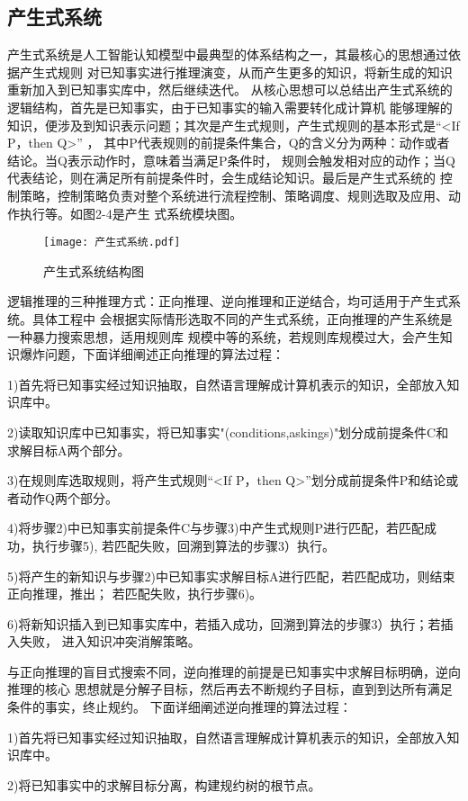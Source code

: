 \documentclass{standalone}
\begin{document}
\subsection{产生式系统}
产生式系统是人工智能认知模型中最典型的体系结构之一，其最核心的思想通过依据产生式规则
对已知事实进行推理演变，从而产生更多的知识，将新生成的知识重新加入到已知事实库中，然后继续迭代。
从核心思想可以总结出产生式系统的逻辑结构，首先是已知事实，由于已知事实的输入需要转化成计算机
能够理解的知识，便涉及到知识表示问题；其次是产生式规则，产生式规则的基本形式是“<If P，then Q>” ，
其中P代表规则的前提条件集合，Q的含义分为两种：动作或者结论。当Q表示动作时，意味着当满足P条件时，
规则会触发相对应的动作；当Q代表结论，则在满足所有前提条件时，会生成结论知识。最后是产生式系统的
控制策略，控制策略负责对整个系统进行流程控制、策略调度、规则选取及应用、动作执行等。如图2-4是产生
式系统模块图。
\begin{figure}[htbp]
	\texttt{[image: 产生式系统.pdf]}
	\caption{产生式系统结构图}
	\label{产生式系统}
\end{figure}
逻辑推理的三种推理方式：正向推理、逆向推理和正逆结合，均可适用于产生式系统。具体工程中
会根据实际情形选取不同的产生式系统，正向推理的产生系统是一种暴力搜索思想，适用规则库
规模中等的系统，若规则库规模过大，会产生知识爆炸问题，下面详细阐述正向推理的算法过程：

1)首先将已知事实经过知识抽取，自然语言理解成计算机表示的知识，全部放入知识库中。

2)读取知识库中已知事实，将已知事实"(conditions,askings)"划分成前提条件C和求解目标A两个部分。

3)在规则库选取规则，将产生式规则“<If P，then Q>”划分成前提条件P和结论或者动作Q两个部分。

4)将步骤2)中已知事实前提条件C与步骤3)中产生式规则P进行匹配，若匹配成功，执行步骤5),
若匹配失败，回溯到算法的步骤3）执行。

5)将产生的新知识与步骤2)中已知事实求解目标A进行匹配，若匹配成功，则结束正向推理，推出；
若匹配失败，执行步骤6)。

6)将新知识插入到已知事实库中，若插入成功，回溯到算法的步骤3）执行；若插入失败，
进入知识冲突消解策略。

与正向推理的盲目式搜索不同，逆向推理的前提是已知事实中求解目标明确，逆向推理的核心
思想就是分解子目标，然后再去不断规约子目标，直到到达所有满足条件的事实，终止规约。
下面详细阐述逆向推理的算法过程：

1)首先将已知事实经过知识抽取，自然语言理解成计算机表示的知识，全部放入知识库中。

2)将已知事实中的求解目标分离，构建规约树的根节点。
\end{document}
